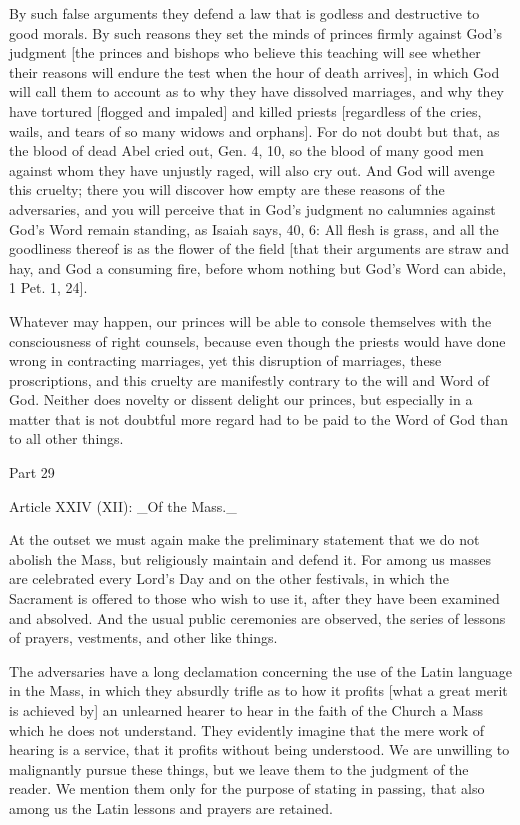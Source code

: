 By such false arguments they defend a law that is godless and
destructive to good morals.  By such reasons they set the minds of
princes firmly against God's judgment [the princes and bishops who
believe this teaching will see whether their reasons will endure the
test when the hour of death arrives], in which God will call them to
account as to why they have dissolved marriages, and why they have
tortured [flogged and impaled] and killed priests [regardless of the
cries, wails, and tears of so many widows and orphans].  For do not
doubt but that, as the blood of dead Abel cried out, Gen. 4, 10, so
the blood of many good men against whom they have unjustly raged,
will also cry out.  And God will avenge this cruelty; there you will
discover how empty are these reasons of the adversaries, and you will
perceive that in God's judgment no calumnies against God's Word
remain standing, as Isaiah says, 40, 6: All flesh is grass, and all
the goodliness thereof is as the flower of the field [that their
arguments are straw and hay, and God a consuming fire, before whom
nothing but God's Word can abide, 1 Pet. 1, 24].

Whatever may happen, our princes will be able to console themselves
with the consciousness of right counsels, because even though the
priests would have done wrong in contracting marriages, yet this
disruption of marriages, these proscriptions, and this cruelty are
manifestly contrary to the will and Word of God.  Neither does
novelty or dissent delight our princes, but especially in a matter
that is not doubtful more regard had to be paid to the Word of God
than to all other things.




Part 29


Article XXIV (XII): _Of the Mass._

At the outset we must again make the preliminary statement that we do
not abolish the Mass, but religiously maintain and defend it.  For
among us masses are celebrated every Lord's Day and on the other
festivals, in which the Sacrament is offered to those who wish to use
it, after they have been examined and absolved.  And the usual public
ceremonies are observed, the series of lessons of prayers, vestments,
and other like things.

The adversaries have a long declamation concerning the use of the
Latin language in the Mass, in which they absurdly trifle as to how
it profits [what a great merit is achieved by] an unlearned hearer to
hear in the faith of the Church a Mass which he does not understand.
They evidently imagine that the mere work of hearing is a service,
that it profits without being understood.  We are unwilling to
malignantly pursue these things, but we leave them to the judgment of
the reader.  We mention them only for the purpose of stating in
passing, that also among us the Latin lessons and prayers are
retained.

